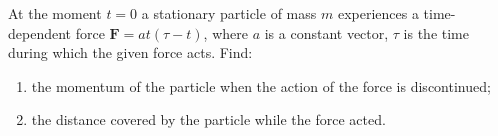 \item At the moment \( t = 0 \) a stationary particle of mass \( m \) experiences a time-dependent force \( \mathbf{F} = a t (\tau - t) \), where \( a \) is a constant vector, \( \tau \) is the time during which the given force acts. Find:
    \begin{enumerate}
        \item the momentum of the particle when the action of the force is discontinued;
        \item the distance covered by the particle while the force acted.
    \end{enumerate}